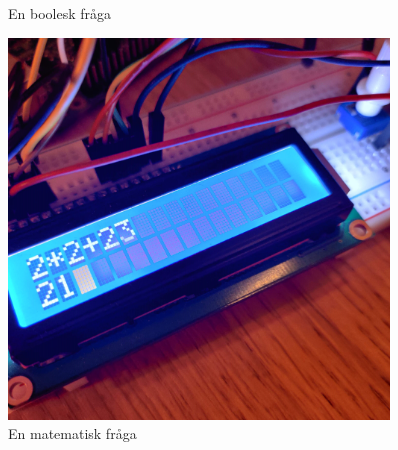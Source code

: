 \begin{figure}[h!]
\begin{minipage}{0.30\textwidth}
        \caption{En boolesk fråga}
    \end{minipage}\hfill
    \begin{minipage}{0.30\textwidth}
        \centering
        \includegraphics[width=0.9\textwidth]{bilder/ma alarm.jpg} %
        \caption{En matematisk fråga}
    \end{minipage}
\end{figure}


